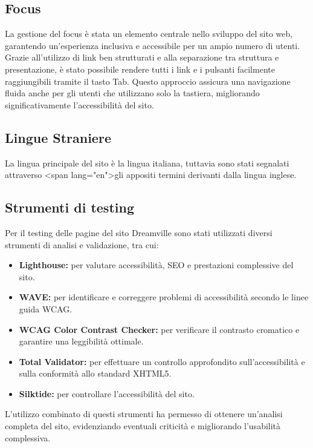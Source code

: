 \subsection{Focus}
La gestione del focus è stata un elemento centrale nello sviluppo del sito web, garantendo un’esperienza inclusiva e accessibile per un ampio numero di utenti. Grazie all’utilizzo di link ben strutturati e alla separazione tra struttura e presentazione, è stato possibile rendere tutti i link e i pulsanti facilmente raggiungibili tramite il tasto Tab. Questo approccio assicura una navigazione fluida anche per gli utenti che utilizzano solo la tastiera, migliorando significativamente l’accessibilità del sito.
\subsection{Lingue Straniere}
La lingua principale del sito è la lingua italiana, tuttavia sono stati segnalati attraverso \textless span lang="en"\textgreater gli appositi termini derivanti dalla lingua inglese.
\subsection{Strumenti di testing}
Per il testing delle pagine del sito Dreamville sono stati utilizzati diversi strumenti di analisi e validazione, tra cui:
\begin{itemize}
    \item \textbf{Lighthouse:} per valutare accessibilità, SEO e prestazioni complessive del sito.
    \item \textbf{WAVE:} per identificare e correggere problemi di accessibilità secondo le linee guida WCAG.
    \item \textbf{WCAG Color Contrast Checker:} per verificare il contrasto cromatico e garantire una leggibilità ottimale.
    \item \textbf{Total Validator:} per effettuare un controllo approfondito sull'accessibilità e sulla conformità allo standard XHTML5.
    \item \textbf{Silktide:} per controllare l'accessibilità del sito.
\end{itemize}

L'utilizzo combinato di questi strumenti ha permesso di ottenere un'analisi completa del sito, evidenziando eventuali criticità e migliorando l'usabilità complessiva.
